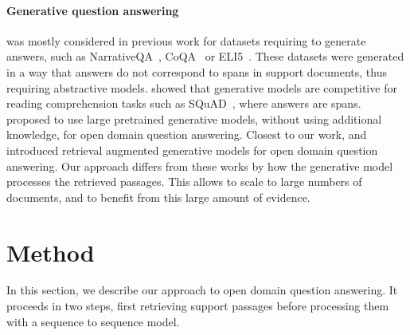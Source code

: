 \documentclass[11pt,a4paper]{article}
\begin{document}
\paragraph{Generative question answering} was mostly considered in previous work for datasets requiring to generate answers, such as NarrativeQA~\citep{kovcisky2018narrativeqa}, CoQA~\citep{reddy2019coqa} or ELI5~\citep{fan2019eli5}.
These datasets were generated in a way that answers do not correspond to spans in support documents, thus requiring abstractive models.
\citet{raffel2019exploring} showed that generative models are competitive for reading comprehension tasks such as SQuAD~\citep{rajpurkar2016squad}, where answers are spans.
\citet{roberts2020much} proposed to use large pretrained generative models, without using additional knowledge, for open domain question answering.
Closest to our work, \citet{min2020ambigqa} and \citet{lewis2020retrieval} introduced retrieval augmented generative models for open domain question answering.
Our approach differs from these works by how the generative model processes the retrieved passages.
This allows to scale to large numbers of documents, and to benefit from this large amount of evidence.

\section{Method}
In this section, we describe our approach to open domain question answering.
It proceeds in two steps, first retrieving support passages before processing them with a sequence to sequence model.
\end{document}
